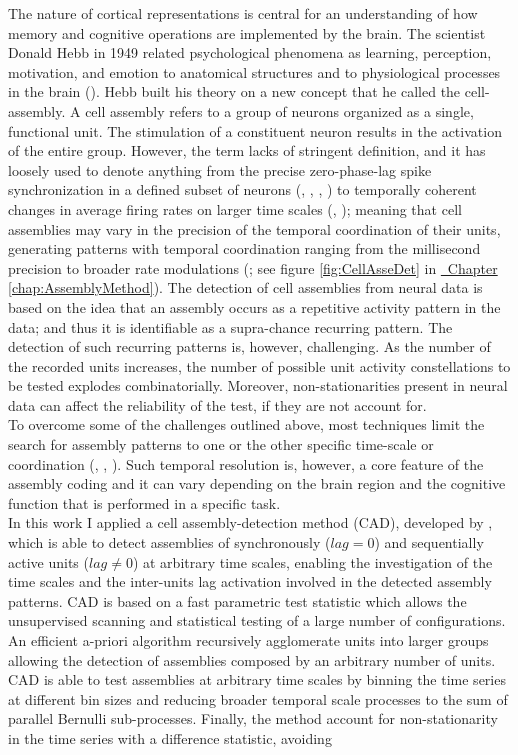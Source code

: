 The nature of cortical representations is central for an understanding of how memory and cognitive operations are implemented by the brain. The scientist Donald Hebb in 1949 related psychological phenomena as learning, perception, motivation, and emotion to anatomical structures and to physiological processes in the brain (\cite{Hebb}). Hebb built his theory on a new concept that he called the cell-assembly. A cell assembly refers to a group of neurons organized as a single, functional unit. The stimulation of a constituent neuron results in the activation of the entire group. However, the term lacks of stringent definition, and it has loosely used to denote anything from the precise zero-phase-lag spike synchronization in a defined subset of neurons (\cite{Abeles}, \cite{Roelfsema}, \cite{Diesmann}, \cite{Harris2003}) to temporally coherent changes in average firing rates on larger time scales (\cite{Goldman}, \cite{Durstewitz}); meaning that cell assemblies may vary in the precision of the temporal coordination of their units, generating patterns with temporal coordination ranging from the millisecond precision to broader rate modulations (\cite{RussoDurstewitz}; see figure \ref{fig:CellAsseDet} in \hyperref[chap:AssemblyMethod]{~Chapter \ref*{chap:AssemblyMethod}}). The detection of cell assemblies from neural data is based on the idea that an assembly occurs as a repetitive activity pattern in the data; and thus it is identifiable as a supra-chance recurring pattern. The detection of such recurring patterns is, however, challenging. As the number of the recorded units increases, the number of possible unit activity constellations to be tested explodes combinatorially. Moreover, non-stationarities present in neural data can affect the reliability of the test, if they are not account for.\\To overcome some of the challenges outlined above, most techniques limit the search for assembly patterns to one or the other specific time-scale or coordination (\cite{Torre}, \cite{Gruen} \cite{Tavoni}, \cite{Billeh}). Such temporal resolution is, however, a core feature of the assembly coding and it can vary depending on the brain region and the cognitive function that is performed in a specific task.\\In this work I applied a cell assembly-detection method (CAD), developed by , which is able to detect assemblies of synchronously ($lag=0$) and sequentially active units ($lag\neq 0$) at arbitrary time scales, enabling the investigation of the time scales and the inter-units lag activation involved in the detected assembly patterns. CAD is based on a fast parametric test statistic which allows the unsupervised scanning and statistical testing of a large number of configurations. An efficient a-priori algorithm recursively agglomerate units into larger groups allowing the detection of assemblies composed by an arbitrary number of units. CAD is able to test assemblies at arbitrary time scales by binning the time series at different bin sizes and reducing broader temporal scale processes to the sum of parallel Bernulli sub-processes. Finally, the method account for non-stationarity in the time series with a difference statistic, avoiding 